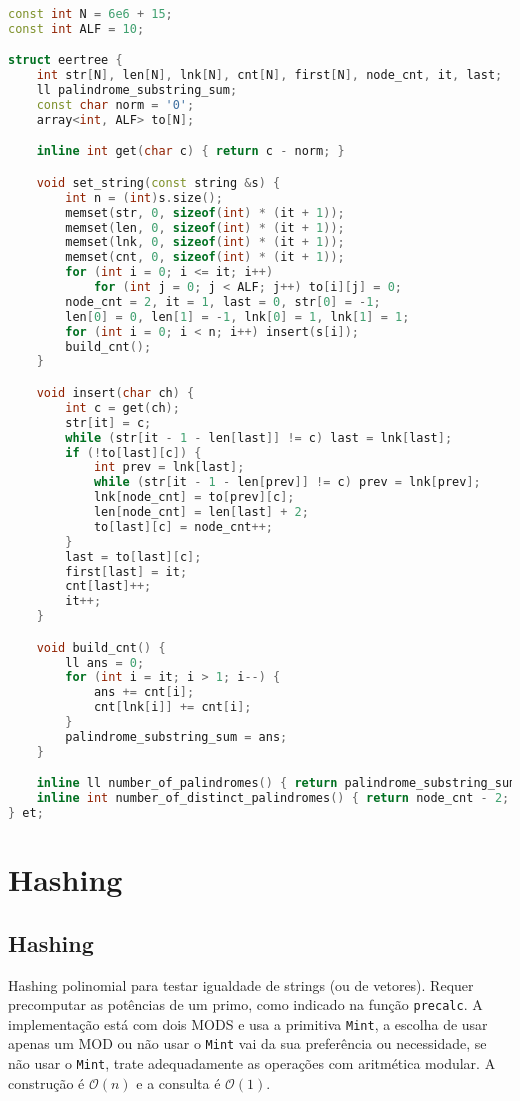 \documentclass[10pt, a4paper, oneside]{book}
\begin{document}
\begin{lstlisting}[language=C++]
const int N = 6e6 + 15;
const int ALF = 10;

struct eertree {
    int str[N], len[N], lnk[N], cnt[N], first[N], node_cnt, it, last;
    ll palindrome_substring_sum;
    const char norm = '0';
    array<int, ALF> to[N];

    inline int get(char c) { return c - norm; }

    void set_string(const string &s) {
        int n = (int)s.size();
        memset(str, 0, sizeof(int) * (it + 1));
        memset(len, 0, sizeof(int) * (it + 1));
        memset(lnk, 0, sizeof(int) * (it + 1));
        memset(cnt, 0, sizeof(int) * (it + 1));
        for (int i = 0; i <= it; i++)
            for (int j = 0; j < ALF; j++) to[i][j] = 0;
        node_cnt = 2, it = 1, last = 0, str[0] = -1;
        len[0] = 0, len[1] = -1, lnk[0] = 1, lnk[1] = 1;
        for (int i = 0; i < n; i++) insert(s[i]);
        build_cnt();
    }

    void insert(char ch) {
        int c = get(ch);
        str[it] = c;
        while (str[it - 1 - len[last]] != c) last = lnk[last];
        if (!to[last][c]) {
            int prev = lnk[last];
            while (str[it - 1 - len[prev]] != c) prev = lnk[prev];
            lnk[node_cnt] = to[prev][c];
            len[node_cnt] = len[last] + 2;
            to[last][c] = node_cnt++;
        }
        last = to[last][c];
        first[last] = it;
        cnt[last]++;
        it++;
    }

    void build_cnt() {
        ll ans = 0;
        for (int i = it; i > 1; i--) {
            ans += cnt[i];
            cnt[lnk[i]] += cnt[i];
        }
        palindrome_substring_sum = ans;
    }

    inline ll number_of_palindromes() { return palindrome_substring_sum; }
    inline int number_of_distinct_palindromes() { return node_cnt - 2; }
} et;
\end{lstlisting}
\hfill

\section{Hashing}
\subsection{Hashing}


Hashing polinomial para testar igualdade de strings (ou de vetores). Requer precomputar as potências de um primo, como indicado na função \texttt{precalc}. A implementação está com dois MODS e usa a primitiva \texttt{Mint}, a escolha de usar apenas um MOD ou não usar o \texttt{Mint} vai da sua preferência ou necessidade, se não usar o \texttt{Mint}, trate adequadamente as operações com aritmética modular. A construção é $\mathcal{O}(n)$ e a consulta é $\mathcal{O}(1)$.
\end{document}
